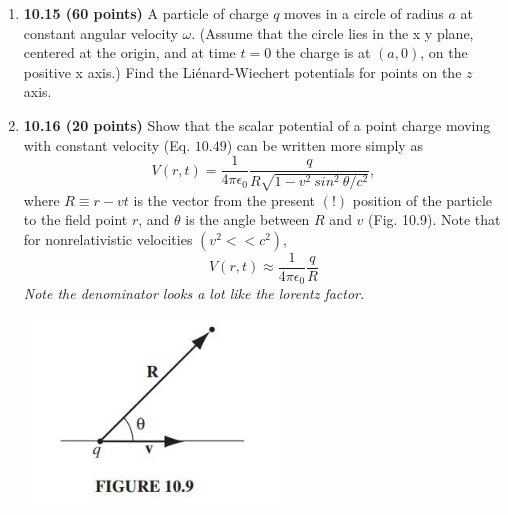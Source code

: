 \documentclass[fleqn]{article}
\begin{document}
  \begin{enumerate}
    \item \textbf{10.15 (60 points)} A particle of charge $q$ moves in a circle of radius $a$ at constant
    angular velocity $\omega$. (Assume that the circle lies in the x y plane, centered at the
    origin, and at time $t = 0$ the charge is at $(a, 0)$, on the positive x axis.) Find the
    Liénard-Wiechert potentials for points on the $z$ axis.


    \item \textbf{10.16 (20 points)} Show that the scalar potential of a point charge moving with constant 
    velocity (Eq. $10.49$) can be written more simply as
    $$
      V(r,t)=\dfrac{1}{4 \pi \epsilon_0} \dfrac{q}{R\sqrt{1-v^2 ~ sin^2 ~ \theta/c^2}},
    $$
    where $R \equiv r-vt$ is the vector from the present $(!)$ position of the particle to the
    field point $r$, and $\theta$ is the angle between $R$ and $v$ (Fig. 10.9). Note that 
    for nonrelativistic velocities $(v^2 << c^2)$,
    $$
      V(r,t) \approx \dfrac{1}{4 \pi \epsilon_0} \dfrac{q}{R}
    $$
    \emph{Note the denominator looks a lot like the lorentz factor.}
    \begin{center}
      \includegraphics[height=5cm, width=7cm]{1.JPG}
    \end{center}



\end{enumerate}
\end{document}
